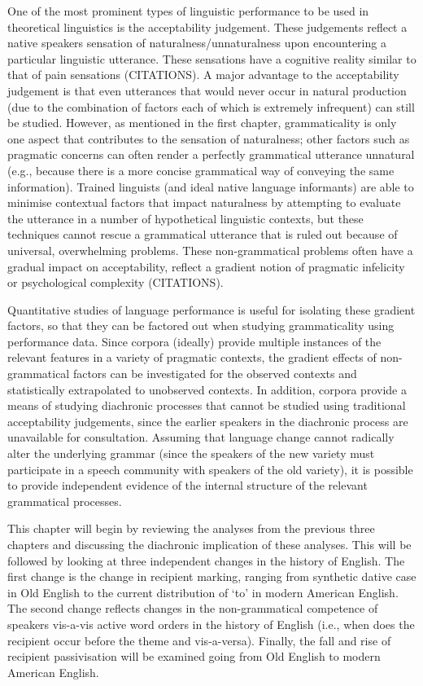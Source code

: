 One of the most prominent types of linguistic performance to be used in theoretical linguistics is the acceptability judgement. These judgements reflect a native speakers sensation of naturalness/unnaturalness upon encountering a particular linguistic utterance. These sensations have a cognitive reality similar to that of pain sensations (CITATIONS). A major advantage to the acceptability judgement is that even utterances that would never occur in natural production (due to the combination of factors each of which is extremely infrequent) can still be studied. However, as mentioned in the first chapter, grammaticality is only one aspect that contributes to the sensation of naturalness; other factors such as pragmatic concerns can often render a perfectly grammatical utterance unnatural (e.g., because there is a more concise grammatical way of conveying the same information). Trained linguists (and ideal native language informants) are able to minimise contextual factors that impact naturalness by attempting to evaluate the utterance in a number of hypothetical linguistic contexts, but these techniques cannot rescue a grammatical utterance that is ruled out because of universal, overwhelming problems. These non-grammatical problems often have a gradual impact on acceptability, reflect a gradient notion of pragmatic infelicity or psychological complexity (CITATIONS).

Quantitative studies of language performance is useful for isolating these gradient factors, so that they can be factored out when studying grammaticality using performance data. Since corpora (ideally) provide multiple instances of the relevant features in a variety of pragmatic contexts, the gradient effects of non-grammatical factors can be investigated for the observed contexts and statistically extrapolated to unobserved contexts. In addition, corpora provide a means of studying diachronic processes that cannot be studied using traditional acceptability judgements, since the earlier speakers in the diachronic process are unavailable for consultation. Assuming that language change cannot radically alter the underlying grammar (since the speakers of the new variety must participate in a speech community with speakers of the old variety), it is possible to provide independent evidence of the internal structure of the relevant grammatical processes.

This chapter will begin by reviewing the analyses from the previous three chapters and discussing the diachronic implication of these analyses. This will be followed by looking at three independent changes in the history of English. The first change is the change in recipient marking, ranging from synthetic dative case in Old English to the current distribution of `to' in modern American English. The second change reflects changes in the non-grammatical competence of speakers vis-a-vis active word orders in the history of English (i.e., when does the recipient occur before the theme and vis-a-versa). Finally, the fall and rise of recipient passivisation will be examined going from Old English to modern American English.

